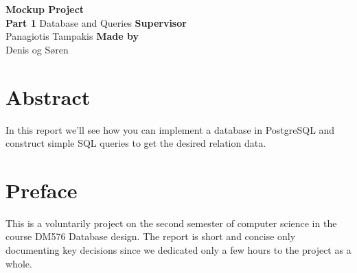 \documentclass{article}
\begin{document}
\begin{titlepage}
    \vfill
    \clearpage\thispagestyle{empty}
    \centering
    {\Large \textbf{Mockup Project} }\vspace{0.5cm} \\
    {\textbf{Part 1} Database and Queries}
    \vfill
    {\textbf{Supervisor}}\\
    {Panagiotis Tampakis}
    \vfill
    {\textbf{Made by}}\\
    {Denis og Søren\\}
    \vskip6cm
\end{titlepage}

\section*{Abstract}
In this report we'll see how you can implement a database in PostgreSQL and
construct simple SQL queries to get the desired relation data.


\newpage
\section*{Preface}
This is a voluntarily project on the second semester of computer science in the course DM576 Database design.
The report is short and concise only documenting key decisions since we dedicated only a few hours to
the project as a whole.

\clearpage
\tableofcontents
\newpage



\newpage


\newpage


\newpage


% 
\end{document}
